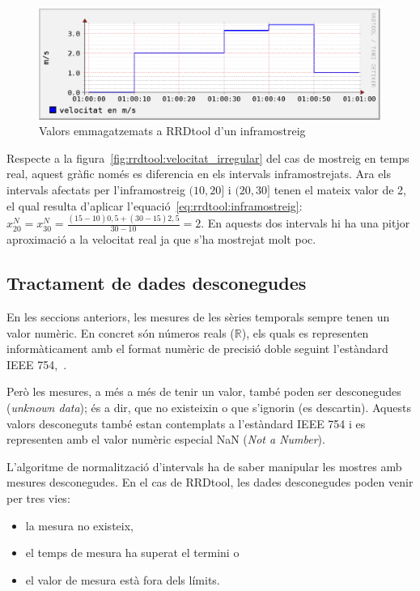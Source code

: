 \begin{figure}[htp]
  \centering
  \includegraphics[width=\textwidth]{imatges/rrdtool/velocitat_inframostrejada.eps}
  \caption{Valors emmagatzemats a RRDtool d'un inframostreig}
  \label{fig:rrdtool:velocitat_inframostrejada}
\end{figure}


Respecte a la figura~\ref{fig:rrdtool:velocitat_irregular} del cas de mostreig en temps real, aquest gràfic només es diferencia en els intervals inframostrejats.
Ara els intervals afectats per l'inframostreig $(10,20]$ i $(20,30]$ tenen el mateix valor de 2, el qual resulta d'aplicar l'equació~\ref{eq:rrdtool:inframostreig}:  
$
x_{20}^N = x_{30}^N  = 
\frac{ (15-10) 0{,}5 + (30-15) 2{,}5 }{30 - 10}
= 2
$.
En aquests dos intervals hi ha una pitjor aproximació a la velocitat real ja que s'ha mostrejat molt poc.



\subsection{Tractament de dades desconegudes}

En les seccions anteriors, les mesures de les sèries temporals sempre tenen un valor numèric. En concret són números reals ($\mathbb{R}$), els quals es representen informàticament amb el format numèric de precisió doble seguint l'estàndard IEEE 754,~\cite{wiki:ieee754}.
 
Però les mesures, a més a més de tenir un valor, també poden ser desconegudes (\emph{unknown data}); és a dir, que no existeixin o que s'ignorin (es descartin).  Aquests valors desconeguts també estan contemplats a l'estàndard IEEE 754 i es representen  amb el valor numèric especial NaN (\emph{Not a Number}). 

L'algoritme de normalització d'intervals ha de saber manipular les mostres amb mesures desconegudes. En el cas de RRDtool, les dades desconegudes poden venir per tres vies:

\begin{itemize}
\item la mesura no existeix,
\item el temps de mesura ha superat el termini o
\item el valor de mesura està fora dels límits.
\end{itemize}


